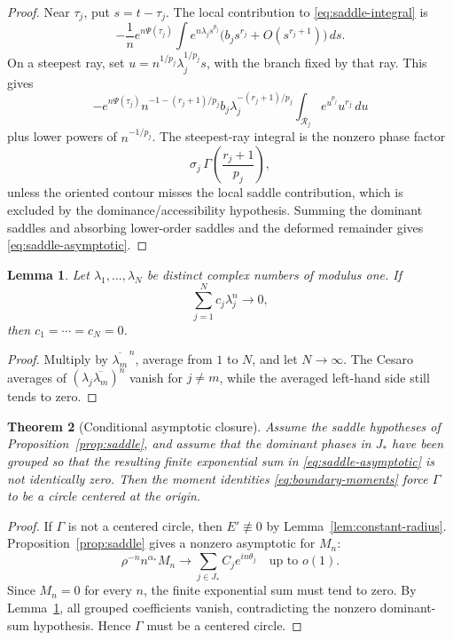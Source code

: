 \documentclass[11pt]{article}
\newtheorem{theorem}{Theorem}[section]
\newtheorem{lemma}[theorem]{Lemma}
\newcommand{\dd}{\,d}
\begin{document}
\begin{proof}
Near \(\tau_j\), put \(s=t-\tau_j\).  The local contribution to
\eqref{eq:saddle-integral} is
\[
  -\frac1n e^{n\Psi(\tau_j)}
  \int e^{n\lambda_j s^{p_j}}
  \bigl(b_js^{r_j}+O(s^{r_j+1})\bigr)\dd s .
\]
On a steepest ray, set \(u=n^{1/p_j}\lambda_j^{1/p_j}s\), with the branch fixed
by that ray.  This gives
\[
  -e^{n\Psi(\tau_j)}
  n^{-1-(r_j+1)/p_j}
  b_j\lambda_j^{-(r_j+1)/p_j}
  \int_{\mathcal R_j} e^{u^{p_j}}u^{r_j}\dd u
\]
plus lower powers of \(n^{-1/p_j}\).  The steepest-ray integral is the nonzero
phase factor
\[
  \sigma_j\,\Gamma\!\left(\frac{r_j+1}{p_j}\right),
\]
unless the oriented contour misses the local saddle contribution, which is
excluded by the dominance/accessibility hypothesis.  Summing the dominant
saddles and absorbing lower-order saddles and the deformed remainder gives
\eqref{eq:saddle-asymptotic}.
\end{proof}

\begin{lemma}\label{lem:exp-sum}
Let \(\lambda_1,\dots,\lambda_N\) be distinct complex numbers of modulus one.
If
\[
  \sum_{j=1}^N c_j\lambda_j^n\to0,
\]
then \(c_1=\cdots=c_N=0\).
\end{lemma}

\begin{proof}
Multiply by \(\overline{\lambda_m}^{\,n}\), average from \(1\) to \(N\), and let
\(N\to\infty\).  The Cesaro averages of
\((\lambda_j\overline{\lambda_m})^n\) vanish for \(j\ne m\), while the averaged
left-hand side still tends to zero.
\end{proof}

\begin{theorem}[Conditional asymptotic closure]\label{thm:conditional-saddle}
Assume the saddle hypotheses of Proposition~\ref{prop:saddle}, and assume that
the dominant phases in \(J_*\) have been grouped so that the resulting finite
exponential sum in \eqref{eq:saddle-asymptotic} is not identically zero.  Then
the moment identities \eqref{eq:boundary-moments} force \(\Gamma\) to be a
circle centered at the origin.
\end{theorem}

\begin{proof}
If \(\Gamma\) is not a centered circle, then \(E'\not\equiv0\) by
Lemma~\ref{lem:constant-radius}.  Proposition~\ref{prop:saddle} gives a nonzero
asymptotic for \(M_n\):
\[
  \rho^{-n}n^{\alpha_*}M_n
  \to
  \sum_{j\in J_*} C_j e^{in\theta_j}
  \quad\text{up to }o(1).
\]
Since \(M_n=0\) for every \(n\), the finite exponential sum must tend to zero.
By Lemma~\ref{lem:exp-sum}, all grouped coefficients vanish, contradicting the
nonzero dominant-sum hypothesis.  Hence \(\Gamma\) must be a centered circle.
\end{proof}
\end{document}
